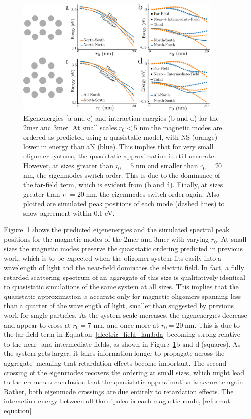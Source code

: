 \documentclass[journal=apchd5,manuscript=article]{achemso}
\begin{document}
\begin{figure}
\includegraphics[width=4in]{2mer-3mer-eig.pdf}
\caption{Eigenenergies (a and c) and interaction energies (b and d) for the 2mer and 3mer. At small scales $r_0 < 5$ nm the magnetic modes are ordered as predicted using a quasistatic model, with NS (orange) lower in energy than aN (blue). This implies that for very small oligomer systems, the quasistatic approximation is still accurate. However, at sizes greater than $r_0 = 5$ nm and smaller than $r_0 = 20$ nm, the eigenmodes switch order. This is due to the dominance of the far-field term, which is evident from (b and d). Finally, at sizes greater than $r_0 = 20$ nm, the eigenmodes switch order again. Also plotted are simulated peak positions of each mode (dashed lines) to show agreement within 0.1 eV.}
\label{scaling}
\end{figure}

Figure~\ref{scaling} shows the predicted eigenenergies and the simulated spectral peak positions for the magnetic modes of the 2mer and 3mer with varying $r_0$. At small sizes the magnetic modes preserve the quasistatic ordering predicted in previous work, which is to be expected when the oligomer system fits easily into a wavelength of light and the near-field dominates the electric field\cite{Cherqui2014}. In fact, a fully retarded scattering spectrum of an aggregate of this size is qualitatively identical to quasistatic simulations of the same system at all sizes. This implies that the quasistatic approximation is accurate only for magnetic oligomers spanning less than a quarter of the wavelength of light, smaller than suggested by previous work for single particles\cite{Economou1974}. As the system scale increases, the eigenenergies decrease and appear to cross at $r_0 = 7$ nm, and once more at $r_0 = 20$ nm. This is due to the far-field term in Equation~\ref{electric_field_lambda} becoming strong relative to the near- and intermediate-fields, as shown in Figure~\ref{scaling}b and d (squares). As the system gets larger, it takes information longer to propagate across the aggregate, meaning that retardation effects become important. The second crossing of the eigenmodes recovers the ordering at small sizes, which might lead to the erroneous conclusion that the quasistatic approximation is accurate again. Rather, both eigenmode crossings are due entirely to retardation effects. The interaction energy between all the dipoles in each magnetic mode, [reformat equation]
\end{document}
